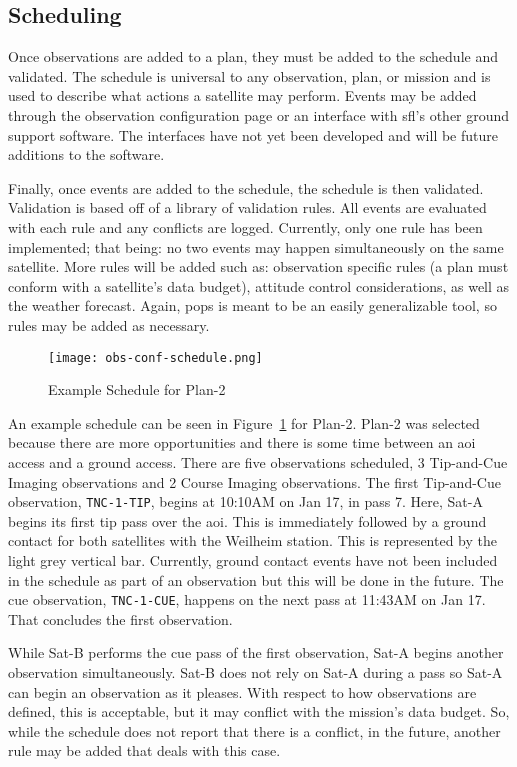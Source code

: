 \subsection{Scheduling}


Once observations are added to a plan, they must be added to the schedule and
validated. The schedule is universal to any observation, plan, or mission and
is used to describe what actions a satellite may perform. Events may be added
through the observation configuration page or an interface with \gls{sfl}’s
other ground support software. The interfaces have not yet been developed and
will be future additions to the software.

Finally, once events are added to the schedule, the schedule is then validated.
Validation is based off of a library of validation rules. All events are
evaluated with each rule and any conflicts are logged. Currently, only one rule
has been implemented; that being: no two events may happen simultaneously on
the same satellite. More rules will be added such as: observation specific
rules (a plan must conform with a satellite’s data budget), attitude control
considerations, as well as the weather forecast. Again, \gls{pops} is meant to
be an easily generalizable tool, so rules may be added as necessary.


\begin{figure}[h]
    \centering
    \texttt{[image: obs-conf-schedule.png]} 
    \caption{Example Schedule for Plan-2}
    \label{fig:obs-conf-schedule}
\end{figure}

An example schedule can be seen in Figure~\ref{fig:obs-conf-schedule} for
Plan-2. Plan-2 was selected because there are more opportunities and there is
some time between an \gls{aoi} access and a ground access. There are five
observations scheduled, 3 Tip-and-Cue Imaging observations and 2 Course Imaging
observations. The first Tip-and-Cue observation, \texttt{TNC-1-TIP}, begins at
10:10AM on Jan 17, in pass 7. Here, Sat-A begins its first tip pass over the
\gls{aoi}.  This is immediately followed by a ground contact for both
satellites with the Weilheim station. This is represented by the light grey
vertical bar.  Currently, ground contact events have not been included in the
schedule as part of an observation but this will be done in the future.  The
cue observation, \texttt{TNC-1-CUE}, happens on the next pass at 11:43AM on Jan
17.  That concludes the first observation.

While Sat-B performs the cue pass of the first observation, Sat-A begins
another observation simultaneously. Sat-B does not rely on Sat-A during a pass
so Sat-A can begin an observation as it pleases. With respect to how
observations are defined, this is acceptable, but it may conflict with the
mission's data budget. So, while the schedule does not report that there is a
conflict, in the future, another rule may be added that deals with this case.

